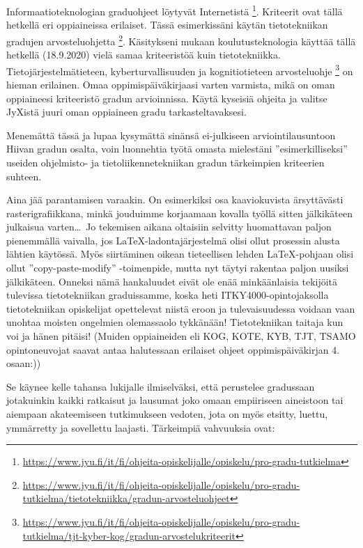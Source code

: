 \documentclass[utf8]{gradu3}
\begin{document}
Informaatioteknologian graduohjeet löytyvät Internetistä%
\footnote{\url{https://www.jyu.fi/it/fi/ohjeita-opiskelijalle/opiskelu/pro-gradu-tutkielma}}.
%
Kriteerit ovat tällä hetkellä eri oppiaineissa erilaiset. Tässä esimerkissäni
käytän tietotekniikan gradujen arvosteluohjetta%
\footnote{\url{https://www.jyu.fi/it/fi/ohjeita-opiskelijalle/opiskelu/pro-gradu-tutkielma/tietotekniikka/gradun-arvosteluohjeet}}.
%
Käsitykseni mukaan koulutusteknologia käyttää tällä hetkellä (18.9.2020) vielä
samaa kriteeristöä kuin tietotekniikka.
%
Tietojärjestelmätieteen, kyberturvallisuuden ja kognitiotieteen arvosteluohje%
\footnote{\url{https://www.jyu.fi/it/fi/ohjeita-opiskelijalle/opiskelu/pro-gradu-tutkielma/tjt-kyber-kog/gradun-arvostelukriteerit}}
on hieman erilainen.
%
Omaa oppimispäiväkirjaasi varten varmista, mikä on oman oppiaineesi kriteeristö
gradun arvioinnissa. Käytä kyseisiä ohjeita ja valitse JyXistä juuri oman
oppiaineen gradu tarkasteltavaksesi.

Menemättä tässä ja lupaa kysymättä sinänsä ei-julkiseen arviointilausuntoon
Hiivan gradun osalta, voin luonnehtia työtä omasta mielestäni
''esimerkilliseksi'' useiden ohjelmisto- ja tietoliikennetekniikan gradun
tärkeimpien kriteerien suhteen.

Aina jää parantamisen varaakin. On esimerkiksi osa kaaviokuvista ärsyttävästi
rasterigrafiikkana, minkä jouduimme korjaamaan kovalla työllä sitten jälkikäteen
julkaisua varten\ldots\ Jo tekemisen aikana oltaisiin selvitty huomattavan
paljon pienemmällä vaivalla, jos \LaTeX -ladontajärjestelmä olisi ollut
prosessin alusta lähtien käytössä. Myös siirtäminen oikean tieteellisen lehden
\LaTeX -pohjaan olisi ollut ''copy-paste-modify'' -toimenpide, mutta nyt täytyi
rakentaa paljon uusiksi jälkikäteen. Onneksi nämä hankaluudet eivät ole enää
minkäänlaisia tekijöitä tulevissa tietotekniikan graduissamme, koska heti
ITKY4000-opintojaksolla tietotekniikan opiskelijat opettelevat niistä eroon ja
tulevaisuudessa voidaan vaan unohtaa moisten ongelmien olemassaolo tykkänään!
Tietotekniikan taitaja kun voi ja hänen pitäisi! (Muiden oppiaineiden eli KOG,
KOTE, KYB, TJT, TSAMO opintoneuvojat saavat antaa halutessaan erilaiset ohjeet
oppimispäiväkirjan 4. osaan:))

Se käynee kelle tahansa lukijalle ilmiselväksi, että \textcite{Hiiva2018vr}
perustelee gradussaan jotakuinkin kaikki ratkaisut ja lausumat joko omaan
empiiriseen aineistoon tai aiempaan akateemiseen tutkimukseen vedoten, jota on
myös etsitty, luettu, ymmärretty ja sovellettu laajasti. Tärkeimpiä vahvuuksia
ovat:
\end{document}

